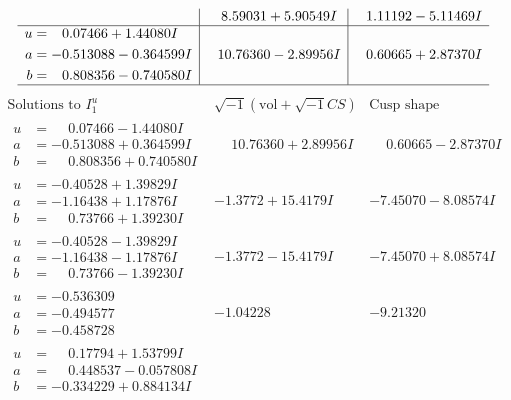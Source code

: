 \documentclass[1p]{elsarticle_modified}
\theoremstyle{definition}
\newcommand{\I}{\sqrt{-1}}
\begin{document}
$$\begin{array}{c|c|c}
 & \phantom{-}8.59031 + 5.90549 I & \phantom{-}1.11192 - 5.11469 I \\ \hline\begin{aligned}
u &= \phantom{-}0.07466 + 1.44080 I \\
a &= -0.513088 - 0.364599 I \\
b &= \phantom{-}0.808356 - 0.740580 I\end{aligned}
 & \phantom{-}10.76360 - 2.89956 I & \phantom{-}0.60665 + 2.87370 I\\
 \hline 
 \end{array}$$\newpage$$\begin{array}{c|c|c}  
\text{Solutions to }I^u_{1}& \I (\text{vol} + \sqrt{-1}CS) & \text{Cusp shape}\\
 \hline 
\begin{aligned}
u &= \phantom{-}0.07466 - 1.44080 I \\
a &= -0.513088 + 0.364599 I \\
b &= \phantom{-}0.808356 + 0.740580 I\end{aligned}
 & \phantom{-}10.76360 + 2.89956 I & \phantom{-}0.60665 - 2.87370 I \\ \hline\begin{aligned}
u &= -0.40528 + 1.39829 I \\
a &= -1.16438 + 1.17876 I \\
b &= \phantom{-}0.73766 + 1.39230 I\end{aligned}
 & -1.3772 + 15.4179 I & -7.45070 - 8.08574 I \\ \hline\begin{aligned}
u &= -0.40528 - 1.39829 I \\
a &= -1.16438 - 1.17876 I \\
b &= \phantom{-}0.73766 - 1.39230 I\end{aligned}
 & -1.3772 - 15.4179 I & -7.45070 + 8.08574 I \\ \hline\begin{aligned}
u &= -0.536309\phantom{ +0.000000I} \\
a &= -0.494577\phantom{ +0.000000I} \\
b &= -0.458728\phantom{ +0.000000I}\end{aligned}
 & -1.04228\phantom{ +0.000000I} & -9.21320\phantom{ +0.000000I} \\ \hline\begin{aligned}
u &= \phantom{-}0.17794 + 1.53799 I \\
a &= \phantom{-}0.448537 - 0.057808 I \\
b &= -0.334229 + 0.884134 I\end{aligned}

\end{array}$$
\end{document}

